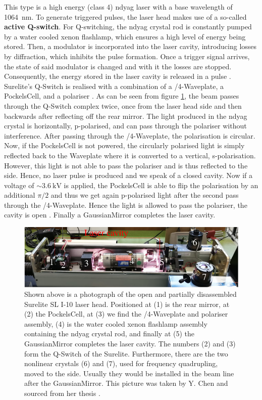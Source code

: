 This type is a high energy (class 4) \gls{ndyag} laser with a base wavelength of \SI{1064}{\nano\metre}. To generate triggered pulses, the laser head makes use of a so-called \textbf{active Q-switch}. For Q-switching, the \gls{ndyag} crystal rod is constantly pumped by a water cooled xenon flashlamp, which ensures a high level of energy being stored. Then, a modulator is incorporated into the laser cavity, introducing losses by diffraction, which inhibits the pulse formation. Once a trigger signal arrives, the state of said modulator is changed and with it the losses are stopped. Consequently, the energy stored in the laser cavity is released in a pulse \cite{LaserBasics2}. Surelite's Q-Switch is realised with a combination of a \textlambda/4-\gls{Waveplate}, a \gls{PockelsCell}, and a polariser \cite{LaserManual}. As can be seen from figure \ref{fig:LaserHead}, the beam passes through the Q-Switch complex twice, once from the laser head side and then backwards after reflecting off the rear mirror. The light produced in the \gls{ndyag} crystal is horizontally, \ie p-polarised, and can pass through the polariser without interference. After passing through the \textlambda/4-\gls{Waveplate}, the polarisation is circular. Now, if the \gls{PockelsCell} is not powered, the circularly polarised light is simply reflected back to the \gls{Waveplate} where it is converted to a vertical, \ie s-polarisation. However, this light is not able to pass the polariser and is thus reflected to the side. Hence, no laser pulse is produced and we speak of a closed cavity. Now if a voltage of $\sim\SI{3.6}{\kilo\volt}$ is applied, the \gls{PockelsCell} is able to flip the polarisation by an additional $\pi/2$ and thus we get again p-polarised light after the second pass through the \textlambda/4-\gls{Waveplate}. Hence the light is allowed to pass the polariser, \ie the cavity is open \cite{LaserTheory,LaserManual}. Finally a \gls{GaussianMirror} completes the laser cavity.
\begin{figure}[htbp]
    \centering
    \includegraphics[width=1.0\textwidth]{images/MicroBooNE/LCSLaserHead.pdf}
    \caption[LCS Laser Head]{Shown above is a photograph of the open and partially disassembled Surelite SL I-10 laser head. Positioned at (1) is the rear mirror, at (2) the \gls{PockelsCell}, at (3) we find the \textlambda/4-\gls{Waveplate} and polariser assembly, (4) is the water cooled xenon flashlamp assembly containing the \gls{ndyag} crystal rod, and finally at (5) the \gls{GaussianMirror} completes the laser cavity. The numbers (2) and (3) form the Q-Switch of the Surelite. Furthermore, there are the two nonlinear crystals (6) and (7), used for frequency quadrupling, moved to the side. Usually they would be installed in the beam line after the \gls{GaussianMirror}. This picture was taken by Y. Chen and sourced from her thesis \cite{LArLaserPhDYifan}.}
    \label{fig:LaserHead}
\end{figure}
